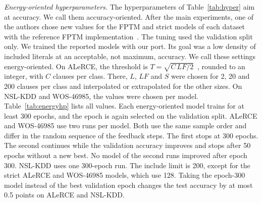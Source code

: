 \documentclass[preprint,review,12pt]{elsarticle}
\newcommand{\LF}{\mathit{LF}}
\newcommand{\wosnew}[1]{#1}   %
\begin{document}
\wosnew{\textit{Energy-oriented hyperparameters.} The hyperparameters of Table~\ref{tab:hyper} aim at accuracy. We call them accuracy-oriented.
After the main experiments, one of the authors chose new values for the FPTM and strict models of each dataset with the reference FPTM implementation~\cite{hnilov2025code}. The tuning used the validation split only. We trained the reported models with our port.
Its goal was a low density of included literals at an acceptable, not maximum, accuracy. We call these settings energy-oriented.
On ALeRCE, the threshold is $T=\sqrt{C\,\LF/2}$~\cite{hnilov2025fptm}, rounded to an integer, with $C$ clauses per class.
There, $L$, $\LF$ and $S$ were chosen for 2, 20 and 200 clauses per class and interpolated or extrapolated for the other sizes.
On NSL-KDD and WOS-46985, the values were chosen per model. Table~\ref{tab:energyhp} lists all values.
Each energy-oriented model trains for at least 300 epochs, and the epoch is again selected on the validation split.
ALeRCE and WOS-46985 use two runs per model. Both use the same sample order and differ in the random sequence of the feedback steps. The first stops at 300 epochs. The second continues while the validation accuracy improves and stops after 50 epochs without a new best. No model of the second runs improved after epoch 300.
NSL-KDD uses one 300-epoch run. The include limit is 200, except for the strict ALeRCE and WOS-46985 models, which use 128.
Taking the epoch-300 model instead of the best validation epoch changes the test accuracy by at most 0.5 points on ALeRCE and NSL-KDD.}
\end{document}
